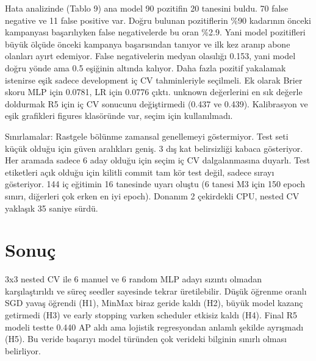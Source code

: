 \documentclass[10.5pt,a4paper]{article}
\newcommand{\tbl}[1]{}
\begin{document}
Hata analizinde (Tablo 9) ana model 90 pozitifin 20 tanesini buldu. 70 false negative ve 11 false positive var. Doğru bulunan pozitiflerin \%90 kadarının önceki kampanyası başarılıyken false negativelerde bu oran \%2.9. Yani model pozitifleri büyük ölçüde önceki kampanya başarısından tanıyor ve ilk kez aranıp abone olanları ayırt edemiyor. False negativelerin medyan olasılığı 0.153, yani model doğru yönde ama 0.5 eşiğinin altında kalıyor. Daha fazla pozitif yakalamak istenirse eşik sadece development iç CV tahminleriyle seçilmeli.
Ek olarak Brier skoru MLP için 0.0781, LR için 0.0776 çıktı. unknown değerlerini en sık değerle doldurmak R5 için iç CV sonucunu değiştirmedi (0.437 ve 0.439). Kalibrasyon ve eşik grafikleri figures klasöründe var, seçim için kullanılmadı.

\begin{table}[H]\centering\caption{Test hata analizi (ana MLP, eşik 0.50). 03\_final\_test.ipynb içinde hesapladım (test\_error\_analysis.csv).}\label{tab:err}\small
\resizebox{.9\linewidth}{!}{\tbl{t8_errors}}\end{table}

Sınırlamalar: Rastgele bölünme zamansal genellemeyi göstermiyor. Test seti küçük olduğu için güven aralıkları geniş. 3 dış kat belirsizliği kabaca gösteriyor. Her aramada sadece 6 aday olduğu için seçim iç CV dalgalanmasına duyarlı. Test etiketleri açık olduğu için kilitli commit tam kör test değil, sadece sırayı gösteriyor. 144 iç eğitimin 16 tanesinde uyarı oluştu (6 tanesi M3 için 150 epoch sınırı, diğerleri çok erken en iyi epoch). Donanım 2 çekirdekli CPU, nested CV yaklaşık 35 saniye sürdü.

\section{Sonuç}
3x3 nested CV ile 6 manuel ve 6 random MLP adayı sızıntı olmadan karşılaştırıldı ve süreç seedler sayesinde tekrar üretilebilir. Düşük öğrenme oranlı SGD yavaş öğrendi (H1), MinMax biraz geride kaldı (H2), büyük model kazanç getirmedi (H3) ve early stopping varken scheduler etkisiz kaldı (H4). Final R5 modeli testte 0.440 AP aldı ama lojistik regresyondan anlamlı şekilde ayrışmadı (H5). Bu veride başarıyı model türünden çok verideki bilginin sınırlı olması belirliyor.
\end{document}
